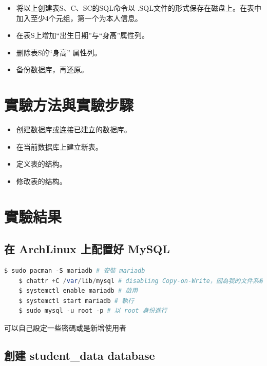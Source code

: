 \documentclass[12pt, a4paper]{report}
\begin{document}
\begin{itemize}
    \item 将以上创建表S、C、SC的SQL命令以 .SQL文件的形式保存在磁盘上。在表中加入至少4个元组，第一个为本人信息。
    \item 在表S上增加“出生日期”与“身高”属性列。
    \item 删除表S的“身高” 属性列。
    \item 备份数据库，再还原。
\end{itemize}

\section{實驗方法與實驗步驟}

\begin{itemize}
    \item 创建数据库或连接已建立的数据库。
    \item 在当前数据库上建立新表。
    \item 定义表的结构。
    \item 修改表的结构。
\end{itemize}

\section{實驗結果}

\subsection{在 ArchLinux 上配置好 MySQL}

\begin{lstlisting}[language=Octave]
    $ sudo pacman -S mariadb # 安裝 mariadb
    $ chattr +C /var/lib/mysql # disabling Copy-on-Write，因為我的文件系統是 Btrfs
    $ systemctl enable mariadb # 啟用
    $ systemctl start mariadb # 執行
    $ sudo mysql -u root -p # 以 root 身份進行
\end{lstlisting}

{可以自己設定一些密碼或是新增使用者}

\subsection{創建 student\_data database}
\end{document}
